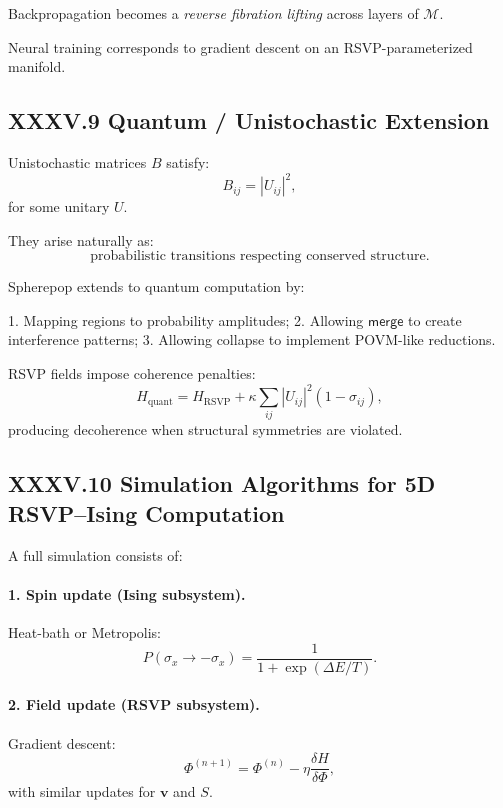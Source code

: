 \documentclass[11pt,letterpaper]{article}
\begin{document}
Backpropagation becomes 
a \emph{reverse fibration lifting} across layers of $\mathcal{M}$.

Neural training corresponds to  
gradient descent on an RSVP-parameterized manifold.

\subsection{XXXV.9 Quantum / Unistochastic Extension}

Unistochastic matrices $B$ satisfy:
\[
B_{ij} = |U_{ij}|^2,
\]
for some unitary $U$.

They arise naturally as:
\[
\text{probabilistic transitions respecting conserved structure}.
\]

Spherepop extends to quantum computation by:

1. Mapping regions to probability amplitudes;  
2. Allowing $\mathsf{merge}$ to create interference patterns;  
3. Allowing collapse to implement POVM-like reductions.

RSVP fields impose coherence penalties:
\[
H_{\text{quant}} 
= H_{\text{RSVP}}
+ \kappa \sum_{ij} |U_{ij}|^2 (1 - \sigma_{ij}),
\]
producing decoherence when structural symmetries are violated.

\subsection{XXXV.10 Simulation Algorithms for 5D RSVP–Ising Computation}

A full simulation consists of:

\paragraph{1. Spin update (Ising subsystem).}
Heat-bath or Metropolis:
\[
P(\sigma_x \to -\sigma_x) 
=
\frac{1}{1 + \exp(\Delta E / T)}.
\]

\paragraph{2. Field update (RSVP subsystem).}
Gradient descent:
\[
\Phi^{(n+1)} = \Phi^{(n)} - \eta \frac{\delta H}{\delta \Phi},
\]
with similar updates for $\mathbf{v}$ and $S$.
\end{document}
